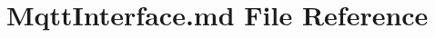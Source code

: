 \hypertarget{_mqtt_interface_8md}{}\section{Mqtt\+Interface.\+md File Reference}
\label{_mqtt_interface_8md}
